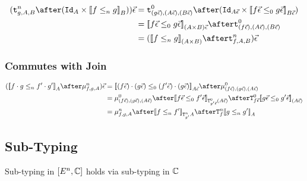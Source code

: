 \documentclass{report}
\begin{document}

\begin{align}
    (\tstrengthn{g}{A}{B}\after(\Id{A}\times \db{f\subeffectn g}_B))\ev & = \tstrengthz{(g\ev)}{(A\ev)}{(B\ev)}\after(\Id{A\ev}\times \db{f\ev \subeffectz g\ev}_{B\ev})\\
    & = \db{f\ev \subeffectz g\ev}_{(A\times B)\ev} \after\tstrengthz{(f\ev)}{(A\ev)}{(B\ev)}\\
    & = (\db{f \subeffectn g}_{(A\times B)} \after\tstrengthn{f}{A}{B})\ev\\
\end{align}

\subsubsection{Commutes with Join}


\begin{align}
    (\dsen{f\dot g}{f'\dot g'}_A\after\bindn{f}{g}{A})\ev & = \dsez{(f\ev)\dot(g\ev)}{(f'\ev)\dot (g\ev)}_{A\ev}\after\bindz{(f\ev)}{(g\ev)}{(A\ev)}\\
    & = \bindz{(f\ev)}{(g\ev)}{(A\ev)}\after\dsez{f\ev}{f'\ev}_{\Tz{g'\ev}{(A\ev)}}\after \Tz{f\ev}{\dsez{g\ev}{g'\ev}}_{(A\ev)}\\
    &= \bindn{f}{g}{A}\after\dsen{f}{f'}_{\Tn{g'}{A}}\after\Tn{f}{\dsen{g}{g'}}_A
\end{align}

\subsection{Sub-Typing}
Sub-typing in $[E^n, \mathbb{C}]$ holds via sub-typing in $\mathbb{C}$
\end{document}
